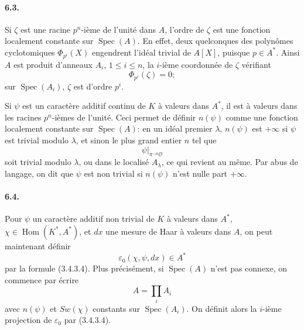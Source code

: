 \documentclass[10pt,letterpaper]{article}
\newcommand{\Hom}{\operatorname{Hom}}
\newcommand{\Spec}{\operatorname{Spec}}
\providecommand{\Spec}{\operatorname{Spec}}
\providecommand{\Hom}{\operatorname{Hom}}
\providecommand{\Hom}{\operatorname{Hom}}
\providecommand{\Spec}{\operatorname{Spec}}
\providecommand{\Spec}{\operatorname{Spec}}
\providecommand{\Hom}{\operatorname{Hom}}
\begin{document}
\paragraph{6.3.} Si \(\zeta\) est une racine \(p^n\)-ième de l'unité dans \(A\), l'ordre de \(\zeta\) est une fonction localement constante sur \(\Spec(A)\). En effet, deux quelconques des polynômes cyclotomiques \(\Phi_{p^i}(X)\) engendrent l'idéal trivial de \(A[X]\), puisque \(p\in A^*\). Ainsi \(A\) est produit d'anneaux \(A_i\), \(1\le i\le n\), la \(i\)-ième coordonnée de \(\zeta\) vérifiant
\[
\Phi_{p^i}(\zeta)=0;
\]
sur \(\Spec(A_i)\), \(\zeta\) est d'ordre \(p^i\).

Si \(\psi\) est un caractère additif continu de \(K\) à valeurs dans \(A^*\), il est à valeurs dans les racines \(p^n\)-ièmes de l'unité. Ceci permet de définir \(n(\psi)\) comme une fonction localement constante sur \(\Spec(A)\): en un idéal premier \(\lambda\), \(n(\psi)\) est \(+\infty\) si \(\psi\) est trivial modulo \(\lambda\), et sinon le plus grand entier \(n\) tel que
\[
\psi|_{\pi^{-n}\mathcal O}
\]
soit trivial modulo \(\lambda\), ou dans le localisé \(A_\lambda\), ce qui revient au même. Par abus de langage, on dit que \(\psi\) est non trivial si \(n(\psi)\) n'est nulle part \(+\infty\).

\paragraph{6.4.} Pour \(\psi\) un caractère additif non trivial de \(K\) à valeurs dans \(A^*\), \(\chi\in\Hom(K^*,A^*)\), et \(dx\) une mesure de Haar à valeurs dans \(A\), on peut maintenant définir
\[
\varepsilon_0(\chi,\psi,dx)\in A^*
\]
par la formule (3.4.3.4). Plus précisément, si \(\Spec(A)\) n'est pas connexe, on commence par écrire
\[
A=\prod_i A_i
\]
avec \(n(\psi)\) et \(Sw(\chi)\) constants sur \(\Spec(A_i)\). On définit alors la \(i\)-ième projection de \(\varepsilon_0\) par (3.4.3.4).
\end{document}
